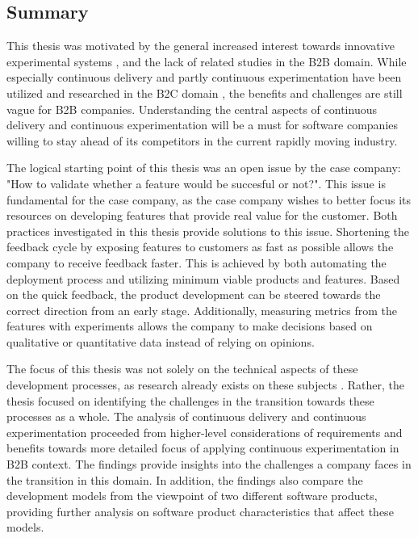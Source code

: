 \documentclass[english]{tktltiki2}
\theoremstyle{definition}
\theoremstyle{remark}
\begin{document}
\subsection{Summary}
This thesis was motivated by the general increased interest towards innovative experimental systems \cite{olsson2012climbing}, and the lack of related studies in the B2B domain. While especially continuous delivery and partly continuous experimentation have been utilized and researched in the B2C domain \cite{neely2013continuous, bosch2012building}, the benefits and challenges are still vague for B2B companies. Understanding the central aspects of continuous delivery and continuous experimentation will be a must for software companies willing to stay ahead of its competitors in the current rapidly moving industry.

The logical starting point of this thesis was an open issue by the case company: "How to validate whether a feature would be succesful or not?". This issue is fundamental for the case company, as  the case company wishes to better focus its resources on developing features that provide real value for the customer. Both practices investigated in this thesis provide solutions to this issue. Shortening the feedback cycle by exposing features to customers as fast as possible allows the company to receive feedback faster. This is achieved by both automating the deployment process and utilizing minimum viable products and features. Based on the quick feedback, the product development can be steered towards the correct direction from an early stage. Additionally, measuring metrics from the features with experiments allows the company to make decisions based on qualitative or quantitative data instead of relying on opinions.
%

The focus of this thesis was not solely on the technical aspects of these development processes, as research already exists on these subjects \cite{kohavi2007practical, eklund2012architecture, cdbook}. Rather, the thesis focused on identifying the challenges in the transition towards these processes as a whole. The analysis of continuous delivery and continuous experimentation proceeded from higher-level considerations of requirements and benefits towards more detailed focus of applying continuous experimentation in B2B context. The findings provide insights into the challenges a company faces in the transition in this domain. In addition, the findings also compare the development models from the viewpoint of two different software products, providing further analysis on software product characteristics that affect these models.
\end{document}
